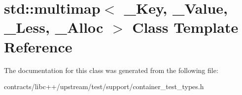 \hypertarget{classstd_1_1multimap}{}\section{std\+:\+:multimap$<$ \+\_\+\+Key, \+\_\+\+Value, \+\_\+\+Less, \+\_\+\+Alloc $>$ Class Template Reference}
\label{classstd_1_1multimap}


The documentation for this class was generated from the following file\+:\begin{DoxyCompactItemize}
\item 
contracts/libc++/upstream/test/support/container\+\_\+test\+\_\+types.\+h\end{DoxyCompactItemize}
